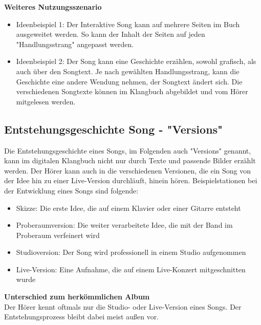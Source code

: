\textbf{Weiteres Nutzungsszenario}
\begin{itemize}
\item Ideenbeispiel 1: Der Interaktive Song kann auf mehrere Seiten im Buch ausgeweitet werden. So kann der Inhalt der Seiten auf jeden "Handlungsstrang" angepasst werden.
\item Ideenbeispiel 2: Der Song kann eine Geschichte erzählen, sowohl grafisch, als auch über den Songtext. Je nach gewählten Handlungsstrang, kann die Geschichte eine andere Wendung nehmen, der Songtext ändert sich. Die verschiedenen Songtexte können im Klangbuch abgebildet und vom Hörer mitgelesen werden.
\end{itemize}





\subsection{Entstehungsgeschichte Song - "Versions"}
Die Entstehungsgeschichte eines Songs, im Folgenden auch "Versions" genannt, kann im digitalen Klangbuch nicht nur durch Texte und passende Bilder erzählt werden. Der Hörer kann auch in die verschiedenen Versionen, die ein Song von der Idee hin zu einer Live-Version durchläuft, hinein hören. Beispielstationen bei der Entwicklung eines Songs sind folgende:

\begin{itemize}
\item Skizze: Die erste Idee, die auf einem Klavier oder einer Gitarre entsteht
\item Proberaumversion: Die weiter verarbeitete Idee, die mit der Band im Proberaum verfeinert wird
\item Studioversion: Der Song wird professionell in einem Studio aufgenommen
\item Live-Version: Eine Aufnahme, die auf einem Live-Konzert mitgeschnitten wurde
\end{itemize}  


\textbf{Unterschied zum herkömmlichen Album}\\
Der Hörer kennt oftmals nur die Studio- oder Live-Version eines Songs. Der Entstehungsprozess bleibt dabei meist außen vor.\\




